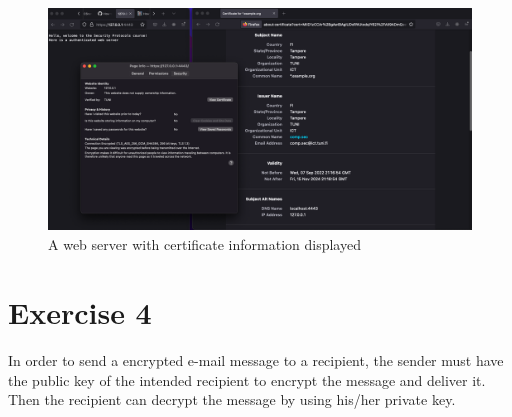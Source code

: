 \documentclass{article}
\begin{document}
%
\begin{figure}[hpt]
    \centering
    \includegraphics[width=\textwidth,height=\textheight,keepaspectratio]{cert.png}
    \caption{A web server with certificate information displayed}
    \label{fig:cert}
\end{figure}

\section*{Exercise 4}
%
In order to send a encrypted e-mail message to a recipient, the sender must have
the public key of the intended recipient to encrypt the message and deliver it.
Then the recipient can decrypt the message by using his/her private key.
\end{document}
